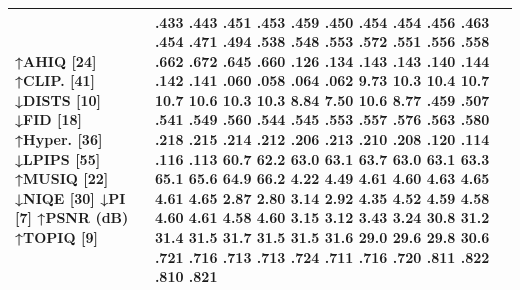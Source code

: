 \begin{tabular}{ll}
\toprule
↑AHIQ [24] ↑CLIP. [41] ↓DISTS [10] ↓FID [18] ↑Hyper. [36] ↓LPIPS [55] ↑MUSIQ [22] ↓NIQE [30] ↓PI [7] ↑PSNR (dB) ↑TOPIQ [9] & .433 .443 .451 .453 .459 .450 .454 .454 .456 .463 .454 .471 .494 .538 .548 .553 .572 .551 .556 .558 .662 .672 .645 .660 .126 .134 .143 .143 .140 .144 .142 .141 .060 .058 .064 .062 9.73 10.3 10.4 10.7 10.7 10.6 10.3 10.3 8.84 7.50 10.6 8.77 .459 .507 .541 .549 .560 .544 .545 .553 .557 .576 .563 .580 .218 .215 .214 .212 .206 .213 .210 .208 .120 .114 .116 .113 60.7 62.2 63.0 63.1 63.7 63.0 63.1 63.3 65.1 65.6 64.9 66.2 4.22 4.49 4.61 4.60 4.63 4.65 4.61 4.65 2.87 2.80 3.14 2.92 4.35 4.52 4.59 4.58 4.60 4.61 4.58 4.60 3.15 3.12 3.43 3.24 30.8 31.2 31.4 31.5 31.7 31.5 31.5 31.6 29.0 29.6 29.8 30.6 .721 .716 .713 .713 .724 .711 .716 .720 .811 .822 .810 .821 \\
\midrule
\bottomrule
\end{tabular}
